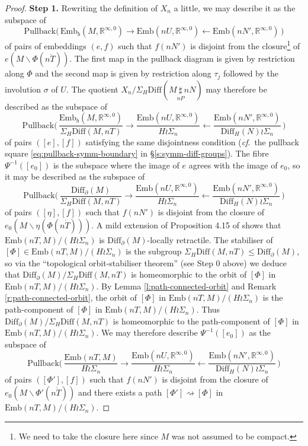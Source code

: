 \documentclass[reqno,a4paper]{article}
\numberwithin{equation}{section}
\theoremstyle{italicised}
\theoremstyle{upright}
\theoremstyle{italicised-restate}
\newcommand{\cf}{\textit{cf}.\ }
\newcommand{\bR}{\mathbb{R}}
\renewcommand{\leq}{\leqslant}
\newcommand{\rinftyz}{\ensuremath{\bR^{\infty,0}}}
\begin{document}
\begin{proof}
\textbf{Step 1.}
Rewriting the definition of $X_n$ a little, we may describe it as the subspace of
\[
\mathrm{Pullback}\bigl(\,\mathrm{Emb}_b(M,\rinftyz) \longrightarrow \mathrm{Emb}(nU,\rinftyz) \longleftarrow \mathrm{Emb}(nN',\rinftyz)\,\bigr)
\]
of pairs of embeddings $(e,f)$ such that $f(nN')$ is disjoint from the closure\footnote{We need to take the closure here since $M$ was not assumed to be compact.} of $e(M \smallsetminus \Phi(n\mathring{T}))$. The first map in the pullback diagram is given by restriction along $\Phi$ and the second map is given by restriction along $\tau_j$ followed by the involution $\sigma$ of $U$. The quotient $X_n/\Sigma_H \mathrm{Diff}(M \underset{nP}{\sharp} nN)$ may therefore be described as the subspace of
\[
\mathrm{Pullback}\biggl(\,\frac{\mathrm{Emb}_b(M,\rinftyz)}{\Sigma_H \mathrm{Diff}(M,nT)} \longrightarrow \frac{\mathrm{Emb}(nU,\rinftyz)}{H \wr \Sigma_n} \longleftarrow \frac{\mathrm{Emb}(nN',\rinftyz)}{\mathrm{Diff}_H(N) \wr \Sigma_n}\,\biggr)
\]
of pairs $([e],[f])$ satisfying the same disjointness condition (\cf the pullback square \eqref{eq:pullback-symm-boundary} in \S\ref{s:symm-diff-groups}). The fibre $\Psi^{-1}([e_0])$ is the subspace where the image of $e$ agrees with the image of $e_0$, so it may be described as the subspace of
\[
\mathrm{Pullback}\biggl(\,\frac{\mathrm{Diff}_\partial(M)}{\Sigma_H \mathrm{Diff}(M,nT)} \longrightarrow \frac{\mathrm{Emb}(nU,\rinftyz)}{H \wr \Sigma_n} \longleftarrow \frac{\mathrm{Emb}(nN',\rinftyz)}{\mathrm{Diff}_H(N) \wr \Sigma_n}\,\biggr)
\]
of pairs $([\eta],[f])$ such that $f(nN')$ is disjoint from the closure of $e_0(M \smallsetminus \eta(\Phi(n\mathring{T})))$. A mild extension of Proposition 4.15 of \cite{Palmer2018HomologicalstabilitymoduliI} shows that $\mathrm{Emb}(nT,M)/(H \wr \Sigma_n)$ is $\mathrm{Diff}_\partial(M)$-locally retractile. The stabiliser of $[\Phi] \in \mathrm{Emb}(nT,M)/(H \wr \Sigma_n)$ is the subgroup $\Sigma_H \mathrm{Diff}(M,nT) \leq \mathrm{Diff}_\partial(M)$, so via the ``topological orbit-stabiliser theorem'' (see Step 0 above) we deduce that $\mathrm{Diff}_\partial(M) / \Sigma_H \mathrm{Diff}(M,nT)$ is homeomorphic to the orbit of $[\Phi]$ in $\mathrm{Emb}(nT,M)/(H \wr \Sigma_n)$. By Lemma \ref{l:path-connected-orbit} and Remark \ref{r:path-connected-orbit}, the orbit of $[\Phi]$ in $\mathrm{Emb}(nT,M)/(H \wr \Sigma_n)$ is the path-component of $[\Phi]$ in $\mathrm{Emb}(nT,M)/(H \wr \Sigma_n)$. Thus $\mathrm{Diff}_\partial(M) / \Sigma_H \mathrm{Diff}(M,nT)$ is homeomorphic to the path-component of $[\Phi]$ in $\mathrm{Emb}(nT,M)/(H \wr \Sigma_n)$. We may therefore describe $\Psi^{-1}([e_0])$ as the subspace of
\[
\mathrm{Pullback}\biggl(\,\frac{\mathrm{Emb}(nT,M)}{H \wr \Sigma_n} \longrightarrow \frac{\mathrm{Emb}(nU,\rinftyz)}{H \wr \Sigma_n} \longleftarrow \frac{\mathrm{Emb}(nN',\rinftyz)}{\mathrm{Diff}_H(N) \wr \Sigma_n}\,\biggr)
\]
of pairs $([\Phi'],[f])$ such that $f(nN')$ is disjoint from the closure of $e_0(M \smallsetminus \Phi'(n\mathring{T}))$ and there exists a path $[\Phi'] \rightsquigarrow [\Phi]$ in $\mathrm{Emb}(nT,M)/(H \wr \Sigma_n)$.


\end{proof}
\end{document}
